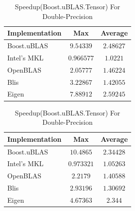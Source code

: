 \begin{table}[ht]
    \centering
    \caption{Speedup(Boost.uBLAS.Tensor) For Single-Precision}
    \begin{tabular}{|l|c|c|}
        \hline
        \textbf{Implementation} & \textbf{Max} & \textbf{Average}\\
        \hline
        Boost.uBLAS         & $9.54339$ & $2.48627$ \\
        \hline
        Intel's MKL         & $0.966577$ & $1.0221$ \\
        \hline
        OpenBLAS            & $2.05777$ & $1.46224$ \\
        \hline
        Blis                & $3.22867$ & $1.42055$ \\
        \hline
        Eigen               & $7.88912$ & $2.59245$ \\
        \hline
    \end{tabular}

    \vspace*{1 cm}

    \centering
    \caption{Speedup(Boost.uBLAS.Tensor) For Double-Precision}
    \begin{tabular}{|l|c|c|}
        \hline
        \textbf{Implementation} & \textbf{Max} & \textbf{Average}\\
        \hline
        Boost.uBLAS         & $10.4865$ & $2.34428$ \\
        \hline
        Intel's MKL         & $0.973321$ & $1.05263$ \\
        \hline
        OpenBLAS            & $2.2179$ & $1.40588$ \\
        \hline
        Blis                & $2.93196$ & $1.30692$ \\
        \hline
        Eigen               & $4.67363$ & $2.344$ \\
        \hline
    \end{tabular}
\end{table}
